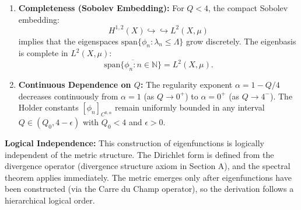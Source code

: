 \begin{lemma}
\begin{enumerate}
\item \textbf{Completeness (Sobolev Embedding):} For $Q < 4$, the compact Sobolev embedding:
\begin{equation}
H^{1,2}(X) \hookrightarrow\hookrightarrow L^2(X, \mu)
\end{equation}
implies that the eigenspaces $\text{span}\{\phi_n : \lambda_n \leq \Lambda\}$ grow discretely. The eigenbasis is complete in $L^2(X, \mu)$:
\begin{equation}
\overline{\text{span}\{\phi_n : n \in \mathbb{N}\}} = L^2(X, \mu).
\end{equation}

\item \textbf{Continuous Dependence on $Q$:} The regularity exponent $\alpha = 1 - Q/4$ decreases continuously from $\alpha = 1$ (as $Q \to 0^+$) to $\alpha = 0^+$ (as $Q \to 4^-$). The Holder constants $[\phi_n]_{C^{0,\alpha}}$ remain uniformly bounded in any interval $Q \in (Q_0, 4-\epsilon)$ with $Q_0 < 4$ and $\epsilon > 0$.

\end{enumerate}

\textbf{Logical Independence:} This construction of eigenfunctions is logically independent of the metric structure. The Dirichlet form is defined from the divergence operator (divergence structure axiom in Section A), and the spectral theorem applies immediately. The metric emerges only after eigenfunctions have been constructed (via the Carre du Champ operator), so the derivation follows a hierarchical logical order.

\end{lemma}

